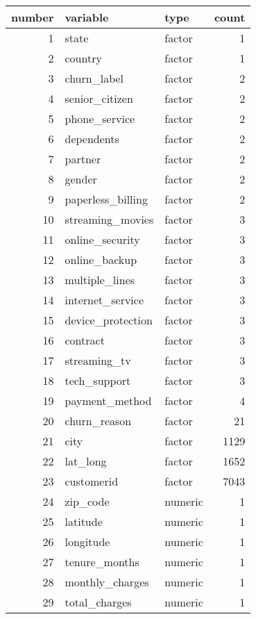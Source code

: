 \begin{tabular}{rllr}
\toprule
 number &          variable &    type &  count \\
\midrule
      1 &             state &  factor &      1 \\
      2 &           country &  factor &      1 \\
      3 &       churn\_label &  factor &      2 \\
      4 &    senior\_citizen &  factor &      2 \\
      5 &     phone\_service &  factor &      2 \\
      6 &        dependents &  factor &      2 \\
      7 &           partner &  factor &      2 \\
      8 &            gender &  factor &      2 \\
      9 & paperless\_billing &  factor &      2 \\
     10 &  streaming\_movies &  factor &      3 \\
     11 &   online\_security &  factor &      3 \\
     12 &     online\_backup &  factor &      3 \\
     13 &    multiple\_lines &  factor &      3 \\
     14 &  internet\_service &  factor &      3 \\
     15 & device\_protection &  factor &      3 \\
     16 &          contract &  factor &      3 \\
     17 &      streaming\_tv &  factor &      3 \\
     18 &      tech\_support &  factor &      3 \\
     19 &    payment\_method &  factor &      4 \\
     20 &      churn\_reason &  factor &     21 \\
     21 &              city &  factor &   1129 \\
     22 &          lat\_long &  factor &   1652 \\
     23 &        customerid &  factor &   7043 \\
     24 &          zip\_code & numeric &      1 \\
     25 &          latitude & numeric &      1 \\
     26 &         longitude & numeric &      1 \\
     27 &     tenure\_months & numeric &      1 \\
     28 &   monthly\_charges & numeric &      1 \\
     29 &     total\_charges & numeric &      1 \\
\bottomrule
\end{tabular}
